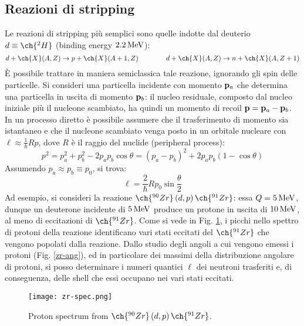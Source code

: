\subsection{Reazioni di stripping}

Le reazioni di stripping più semplici sono quelle indotte dal deuterio $ d \equiv \ch{^2H} $ (binding energy $ 2.2\,\mathrm{MeV} $):
\begin{equation*}
	d + \ch{X}(A,Z) \rightarrow p + \ch{X}(A+1,Z)
	\qquad \qquad
	d + \ch{X}(A,Z) \rightarrow n + \ch{X}(A,Z+1)
\end{equation*}
È possibile trattare in maniera semiclassica tale reazione, ignorando gli spin delle particelle. Si consideri una particella incidente con momento $ \mathbf{p}_a $ che determina una particella in uscita di momento $ \mathbf{p}_b $: il nucleo residuale, composto dal nucleo iniziale più il nucleone scambiato, ha quindi un momento di recoil $ \mathbf{p} = \mathbf{p}_a - \mathbf{p}_b $. In un processo diretto è possibile assumere che il trasferimento di momento sia istantaneo e che il nucleone scambiato venga posto in un orbitale nucleare con $ \ell \approx \frac{1}{\hbar} Rp $, dove $ R $ è il raggio del nuclide (peripheral process):
\begin{equation*}
	p^2 = p_a^2 + p_b^2 - 2 p_a p_b \cos \theta = \left( p_a - p_b \right)^2 + 2 p_a p_b \left( 1 - \cos \theta \right)
\end{equation*}
Assumendo $ p_a \approx p_b \equiv p_0 $, si trova:
\begin{equation}
	\ell = \frac{2}{\hbar} R p_0 \sin \frac{\theta}{2}
	\label{eq:6.7}
\end{equation}
Ad esempio, si consideri la reazione $ \ch{^{90}Zr} \left( d,p \right) \ch{^{91}Zr} $: essa $ Q = 5\,\mathrm{MeV} $, dunque un deuterone incidente di $ 5\,\mathrm{MeV} $ produce un protone in uscita di $ 10\,\mathrm{MeV} $, al meno di eccitazioni di $ \ch{^{91}Zr} $.
Come si vede in Fig. \ref{zr-spec}, i picchi nello spettro di protoni della reazione identificano vari stati eccitati del $ \ch{^{91}Zr} $ che vengono popolati dalla reazione. Dallo studio degli angoli a cui vengono emessi i protoni (Fig. \ref{zr-ang}), ed in particolare dei massimi della distribuzione angolare di protoni, si posso determinare i numeri quantici $ \ell $ dei neutroni trasferiti e, di conseguenza, delle shell che essi occupano nei vari stati eccitati.

\begin{figure}[H]
	\centering
	\texttt{[image: zr-spec.png]}
	\caption{Proton spectrum from $ \ch{^{90}Zr} \left( d,p \right) \ch{^{91}Zr} $.}
	\label{zr-spec}
\end{figure}

